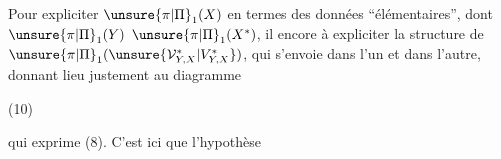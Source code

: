 
Pour expliciter $\unsure{\pi|\Pi}_1(X)$ en termes des données ``élémentaires'',  dont $\unsure{\pi|\Pi}_1(Y)$  $\unsure{\pi|\Pi}_1(X^*)$,  il  encore à expliciter la structure de $\unsure{\pi|\Pi}_1(\unsure{\mathcal V_{Y,X}^*|V_{Y,X}^*})$, qui s'envoie dans l'un et dans l'autre, donnant lieu justement au diagramme


(10)

qui exprime (8). C'est ici que l'hypothèse

